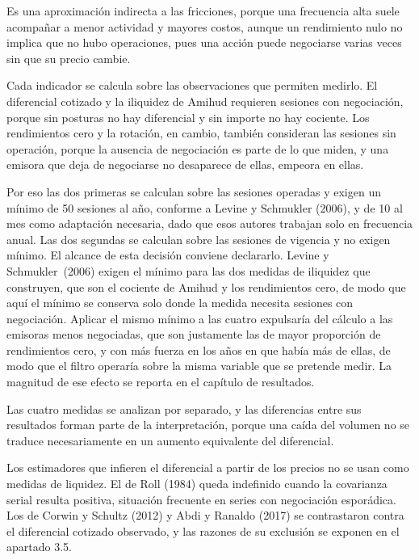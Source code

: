 Es una aproximación indirecta a las fricciones, porque una frecuencia alta suele acompañar a menor actividad y mayores costos, aunque un rendimiento nulo no implica que no hubo operaciones, pues una acción puede negociarse varias veces sin que su precio cambie.

Cada indicador se calcula sobre las observaciones que permiten medirlo. El diferencial cotizado y la iliquidez de Amihud requieren sesiones con negociación, porque sin posturas no hay diferencial y sin importe no hay cociente. Los rendimientos cero y la rotación, en cambio, también consideran las sesiones sin operación, porque la ausencia de negociación es parte de lo que miden, y una emisora que deja de negociarse no desaparece de ellas, empeora en ellas.

Por eso las dos primeras se calculan sobre las sesiones operadas y exigen un mínimo de 50 sesiones al año, conforme a Levine y Schmukler (2006), y de 10 al mes como adaptación necesaria, dado que esos autores trabajan solo en frecuencia anual. Las dos segundas se calculan sobre las sesiones de vigencia y no exigen mínimo. El alcance de esta decisión conviene declararlo. Levine y Schmukler~(2006) exigen el mínimo para las dos medidas de iliquidez que construyen, que son el cociente de Amihud y los rendimientos cero, de modo que aquí el mínimo se conserva solo donde la medida necesita sesiones con negociación. Aplicar el mismo mínimo a las cuatro expulsaría del cálculo a las emisoras menos negociadas, que son justamente las de mayor proporción de rendimientos cero, y con más fuerza en los años en que había más de ellas, de modo que el filtro operaría sobre la misma variable que se pretende medir. La magnitud de ese efecto se reporta en el capítulo de resultados.

Las cuatro medidas se analizan por separado, y las diferencias entre sus resultados forman parte de la interpretación, porque una caída del volumen no se traduce necesariamente en un aumento equivalente del diferencial.

Los estimadores que infieren el diferencial a partir de los precios no se usan como medidas de liquidez. El de Roll (1984) queda indefinido cuando la covarianza serial resulta positiva, situación frecuente en series con negociación esporádica. Los de Corwin y Schultz (2012) y Abdi y Ranaldo (2017) se contrastaron contra el diferencial cotizado observado, y las razones de su exclusión se exponen en el apartado 3.5.



